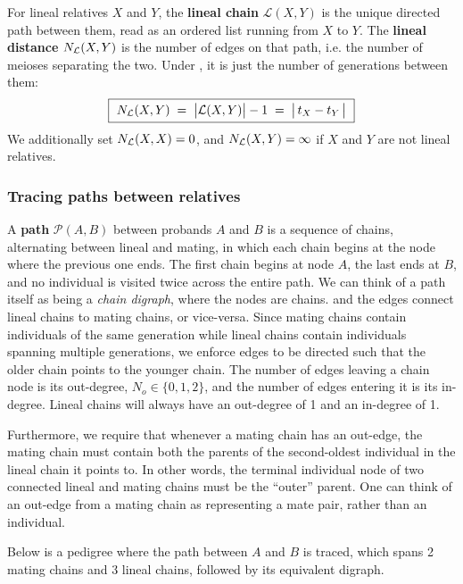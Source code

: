 \documentclass[12pt]{article}
\renewcommand{\Lin}{\mathcal{L}}
\begin{document}
For lineal relatives $X$ and $Y$, the \textbf{lineal chain} $\Lin(X,Y)$ is the unique directed path between them, read as an ordered list running from $X$ to $Y$.
The \textbf{lineal distance} $N_{\mathcal{L}}(X,Y)$ is the number of edges on that path, i.e. the number of meioses separating the two.
Under , it is just the number of generations between them:
    \begin{equation}\label{eq:lineal-dist}
        \boxed{\ \Nlin(X,Y) \;=\; \big|\Lin(X,Y)\big| - 1 \;=\; \big|\, t_X - t_Y \,\big| \ }
    \end{equation}
We additionally set $N_{\mathcal{L}}(X,X) = 0$, and $N_{\mathcal{L}}(X,Y) = \infty$ if $X$ and $Y$ are not lineal relatives.

\subsubsection{Tracing paths between relatives}


    A \textbf{path} $\mathcal{P}(A,B)$ between probands $A$ and $B$ is a sequence of chains, alternating between lineal and mating, in which each chain begins at the node where the previous one ends.
    The first chain begins at node $A$, the last ends at $B$, and no individual is visited twice across the entire path.
    We can think of a path itself as being a \emph{chain digraph}, where the nodes are chains. and the edges connect lineal chains to mating chains, or vice-versa.
    Since mating chains contain individuals of the same generation while lineal chains contain individuals spanning multiple generations, we enforce edges to be directed such that the older chain points to the younger chain.
    The number of edges leaving a chain node is its out-degree, $N_o \in \{0,1,2\}$, and the number of edges entering it is its in-degree.
    Lineal chains will always have an out-degree of 1 and an in-degree of 1.

    Furthermore, we require that whenever a mating chain has an out-edge, the mating chain must contain both the parents of the second-oldest individual in the lineal chain it points to.
    In other words, the terminal individual node of two connected lineal and mating chains must be the ``outer'' parent.
    One can think of an out-edge from a mating chain as representing a mate pair, rather than an individual.


Below is a pedigree where the path between $A$ and $B$ is traced, which spans 2 mating chains and 3 lineal chains, followed by its equivalent digraph.
\end{document}
